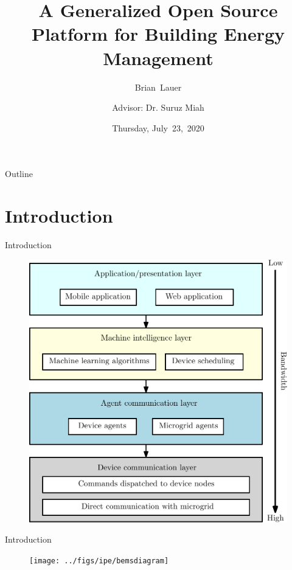 \documentclass{beamer}
\title[Progress Update]{A Generalized Open Source Platform for Building Energy Management}
\author[B.~Lauer]{Brian~Lauer\\\and
Advisor: Dr. Suruz Miah}
\institute[Bradley University] %
{
  Department of Electrical and Computer Engineering\\
  Bradley University\\
  1501 W. Bradley Avenue\\
  Peoria, IL, 61625, USA
}
\date[July~23,~2020]{Thursday, July~23,~2020}
\begin{document}
\begin{frame}
  \titlepage
\end{frame}

\begin{frame}{Outline}
  \tableofcontents
\end{frame}
\section{Introduction}

\begin{frame}{Introduction}{}
  \begin{figure}
  \includegraphics[scale=0.35]{../figs/ipe/BEMS-softwareArchitecture}
  \end{figure}
\end{frame}

\begin{frame}{Introduction}{}
  \begin{figure}
  \texttt{[image: ../figs/ipe/bemsdiagram]}
  \end{figure}
\end{frame}
\end{document}
